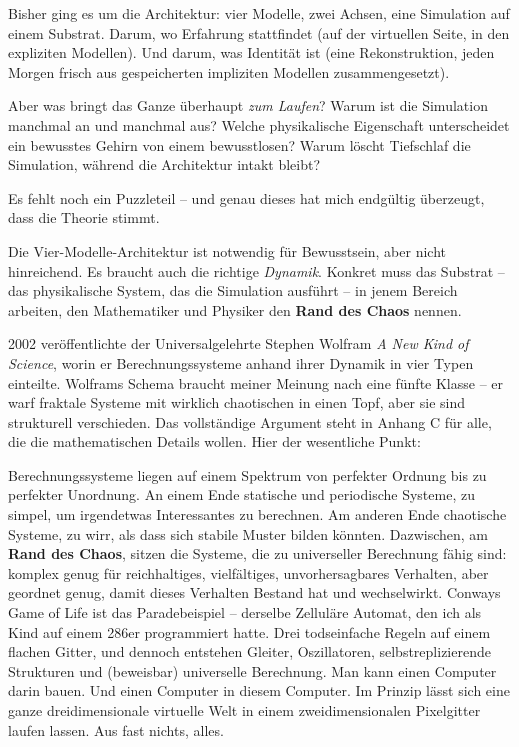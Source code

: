 \documentclass[11pt, twoside, openright]{book}
\begin{document}
Bisher ging es um die Architektur: vier Modelle, zwei Achsen, eine Simulation auf einem Substrat. Darum, wo Erfahrung stattfindet (auf der virtuellen Seite, in den expliziten Modellen). Und darum, was Identität ist (eine Rekonstruktion, jeden Morgen frisch aus gespeicherten impliziten Modellen zusammengesetzt).

Aber was bringt das Ganze überhaupt \textit{zum Laufen}? Warum ist die Simulation manchmal an und manchmal aus? Welche physikalische Eigenschaft unterscheidet ein bewusstes Gehirn von einem bewusstlosen? Warum löscht Tiefschlaf die Simulation, während die Architektur intakt bleibt?

Es fehlt noch ein Puzzleteil -- und genau dieses hat mich endgültig überzeugt, dass die Theorie stimmt.

Die Vier-Modelle-Architektur ist notwendig für Bewusstsein, aber nicht hinreichend. Es braucht auch die richtige \textit{Dynamik}. Konkret muss das Substrat -- das physikalische System, das die Simulation ausführt -- in jenem Bereich arbeiten, den Mathematiker und Physiker den \textbf{Rand des Chaos} nennen.

2002 veröffentlichte der Universalgelehrte Stephen Wolfram \textit{A New Kind of Science}, worin er Berechnungssysteme anhand ihrer Dynamik in vier Typen einteilte. Wolframs Schema braucht meiner Meinung nach eine fünfte Klasse -- er warf fraktale Systeme mit wirklich chaotischen in einen Topf, aber sie sind strukturell verschieden. Das vollständige Argument steht in Anhang C für alle, die die mathematischen Details wollen. Hier der wesentliche Punkt:

Berechnungssysteme liegen auf einem Spektrum von perfekter Ordnung bis zu perfekter Unordnung. An einem Ende statische und periodische Systeme, zu simpel, um irgendetwas Interessantes zu berechnen. Am anderen Ende chaotische Systeme, zu wirr, als dass sich stabile Muster bilden könnten. Dazwischen, am \textbf{Rand des Chaos}, sitzen die Systeme, die zu universeller Berechnung fähig sind: komplex genug für reichhaltiges, vielfältiges, unvorhersagbares Verhalten, aber geordnet genug, damit dieses Verhalten Bestand hat und wechselwirkt. Conways Game of Life ist das Paradebeispiel -- derselbe Zelluläre Automat, den ich als Kind auf einem 286er programmiert hatte. Drei todseinfache Regeln auf einem flachen Gitter, und dennoch entstehen Gleiter, Oszillatoren, selbstreplizierende Strukturen und (beweisbar) universelle Berechnung. Man kann einen Computer darin bauen. Und einen Computer in diesem Computer. Im Prinzip lässt sich eine ganze dreidimensionale virtuelle Welt in einem zweidimensionalen Pixelgitter laufen lassen. Aus fast nichts, alles.
\end{document}
